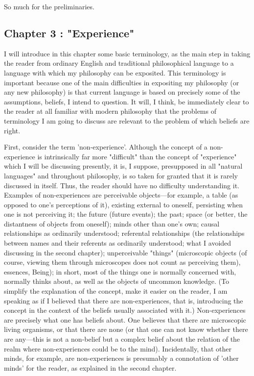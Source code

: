 \documentclass[10pt,twoside,draft]{memoir}
\begin{document}
So much for the preliminaries. 

\subsection*{Chapter 3 : "Experience"}

I will introduce in this chapter some basic terminology, as the main step 
in taking the reader from ordinary English and traditional philosophical 
language to a language with which my philosophy can be exposited. This 
terminology is important because one of the main difficulties in expositing 
my philosophy (or any new philosophy) is that current language is based on 
precisely some of the assumptions, beliefs, I intend to question. It will, I 
think, be immediately clear to the reader at all familiar with modern 
philosophy that the problems of terminology I am going to discuss are 
relevant to the problem of which beliefs are right. 

First, consider the term 'non-experience'. Although the concept of a 
non-experience is intrinsically far more "difficult" than the concept of 
"experience" which I will be discussing presently, it is, I suppose, 
presupposed in all "natural languages" and throughout philosophy, is so 
taken for granted that it is rarely discussed in itself. Thus, the reader should 
have no difficulty understanding it. Examples of non-experiences are 
perceivable objects---for example, a table (as opposed to one's perceptions of 
it), existing external to oneself, persisting when one is not perceiving it; the 
future (future events); the past; space (or better, the distantness of objects 
from oneself); minds other than one's own; causal relationships as ordinarily 
understood; referental relationships (the relationships between names and 
their referents as ordinarily understood; what I avoided discussing in the 
second chapter); unperceivable "things" (microscopic objects (of course, 
viewing them through microscopes does not count as perceiving them), 
essences, Being); in short, most of the things one is normally concerned with, 
normally thinks about, as well as the objects of uncommon knowledge. (To 
simplify the explanation of the concept, make it easier on the reader, I am 
speaking as if I believed that there are non-experiences, that is, introducing 
the concept in the context of the beliefs usually associated with it.) 
Non-experiences are precisely what one has beliefs about. One believes that 
there are microscopic living organisms, or that there are none (or that one 
can not know whether there are any---this is not a non-belief but a complex 
belief about the relation of the realm where non-experiences could be to the 
mind). Incidentally, that other minds, for example, are non-experiences is 
presumably a connotation of 'other minds' for the reader, as explained in the 
second chapter. 
\end{document}

